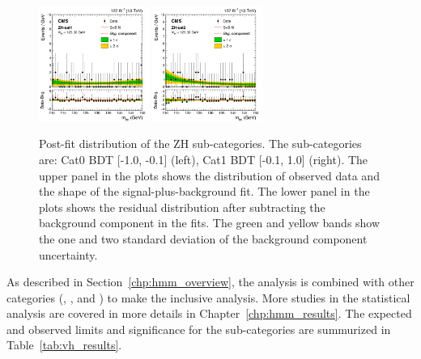 \begin{figure}[!htb]
  \centering
  \captionsetup{justification=justified}
  \includegraphics[width=0.32\textwidth]{pics/VH_sec/VH_results/postfit_ZH_cat1.png}
  \includegraphics[width=0.32\textwidth]{pics/VH_sec/VH_results/postfit_ZH_cat2.png}
  \caption{Post-fit \mmm distribution of the ZH sub-categories. The sub-categories are: Cat0 BDT [-1.0, -0.1] (left), Cat1 BDT [-0.1, 1.0] (right). 
           The upper panel in the plots shows the distribution of observed data and the shape of the signal-plus-background fit.
           The lower panel in the plots shows the residual distribution after subtracting the background component in the fits.
           The green and yellow bands show the one and two standard deviation of the background component uncertainty.}
  \label{fig:zh_postfit}
\end{figure}

As described in Section~\ref{chp:hmm_overview}, 
the \VH analysis is combined with other categories (\ggH, \qqH, and \ttH) to make the inclusive \hmm analysis.
More studies in the statistical analysis are covered in more details in Chapter~\ref{chp:hmm_results}.
The expected and observed limits and significance for the \VH sub-categories are summurized in Table~\ref{tab:vh_results}.

